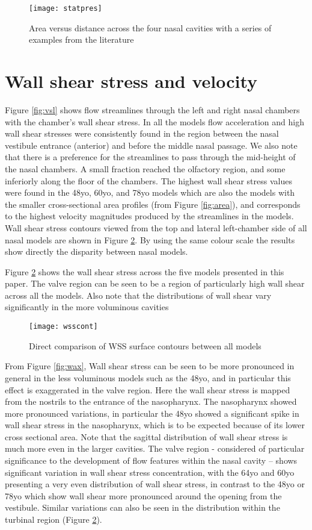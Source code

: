 \begin{figure} 
  \texttt{[image: statpres]}
  \caption{Area versus distance across the four nasal cavities with a series of examples from the literature}
  \label{fig:stpr}
\end{figure}

\section{Wall shear stress and velocity}
Figure \ref{fig:vsl} shows flow streamlines through the left and right nasal chambers with the chamber’s wall shear stress. In all the models flow acceleration and high wall shear stresses were consistently found in the region between the nasal vestibule entrance (anterior) and before the middle nasal passage. We also note that there is a preference for the streamlines to pass through the mid-height of the nasal chambers. A small fraction reached the olfactory region, and some inferiorly along the floor of the chambers. The highest wall shear stress values were found in the 48yo, 60yo, and 78yo models which are also the models with the smaller cross-sectional area profiles (from Figure \ref{fig:area}), and corresponds to the highest velocity magnitudes produced by the streamlines in the models. Wall shear stress contours viewed from the top and lateral left-chamber side of all nasal models are shown in Figure \ref{fig:wcont}. By using the same colour scale the results show directly the disparity between nasal models.

Figure \ref{fig:wcont} shows the wall shear stress across the five models presented in this paper. The valve region can be seen to be a region of particularly high wall shear across all the models. Also note that the distributions of wall shear vary significantly in the more voluminous cavities

\begin{figure} 
  \texttt{[image: wsscont]}
  \caption{Direct comparison of WSS surface contours between all models}
    \label{fig:wcont}
\end{figure}

From Figure \ref{fig:wax}, Wall shear stress can be seen to be more pronounced in general in the less voluminous models such as the 48yo, and in particular this effect is exaggerated in the valve region. Here the wall shear stress is mapped from the nostrils to the entrance of the nasopharynx. The nasopharynx showed more pronounced variations, in particular the 48yo showed a significant spike in wall shear stress in the nasopharynx, which is to be expected because of its lower cross sectional area. Note that the sagittal distribution of wall shear stress is much more even in the larger cavities.  The valve region - considered of particular significance to the development of flow features within the nasal cavity \cite{Lindemann2008} – shows significant variation in wall shear stress concentration, with the 64yo and 60yo presenting a very even distribution of wall shear stress, in contrast to the 48yo or 78yo which show wall shear more pronounced around the opening from the vestibule. Similar variations can also be seen in the distribution within the turbinal region (Figure \ref{fig:wcont}). 

